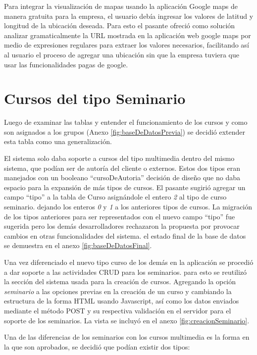 	Para integrar la visualización de mapas usando la aplicación Google maps de manera gratuita para la empresa, el usuario debía ingresar los valores de latitud y longitud de la ubicación deseada. Para esto el pasante ofreció como solución analizar gramaticalmente la URL mostrada en la aplicación web google maps por medio de expresiones regulares para extraer los valores necesarios, facilitando así al usuario el proceso de agregar una ubicación sin que la empresa tuviera que usar las funcionalidades pagas de google.


	\section{Cursos del tipo Seminario} %
	\label{sec:cursos_del_tipo_seminario}
	
	Luego de examinar las tablas y entender el funcionamiento de los cursos y como son asignados a los grupos (Anexo \ref{fig:baseDeDatosPrevia}) se decidió extender esta tabla como una generalización.

	El sistema solo daba soporte a cursos del tipo multimedia dentro del mismo sistema, que podían ser de autoría del cliente o externos. Estos dos tipos eran manejados con un booleano ``cursoDeAutoria'' decisión de diseño que no daba espacio para la expansión de más tipos de cursos. El pasante sugirió agregar un campo ``tipo'' a la tabla de Curso asignándole el entero \emph{2} al tipo de curso seminario. dejando los enteros \emph{0} y \emph{1} a los anteriores tipos de cursos. La migración de los tipos anteriores para ser representados con el nuevo campo ``tipo'' fue sugerida pero los demás desarrolladores rechazaron la propuesta por provocar cambios en otras funcionalidades del sistema. el estado final de la base de datos se demuestra en el anexo \ref{fig:baseDeDatosFinal}.

	Una vez diferenciado el nuevo tipo curso de los demás en la aplicación se procedió a dar soporte a las actividades CRUD para los seminarios. para esto se reutilizó la sección del sistema usada para la creación de cursos. Agregando la opción \emph{seminario} a las opciones previas en la creación de un curso y cambiando la estructura de la forma HTML usando Javascript, así como los datos enviados mediante el método POST y su respectiva validación en el servidor para el soporte de los seminarios. La vista se incluyó en el anexo \ref{fig:creacionSeminario}.

	Una de las diferencias de los seminarios con los cursos multimedia es la forma en la que son aprobados, se decidió que podían existir dos tipos:

